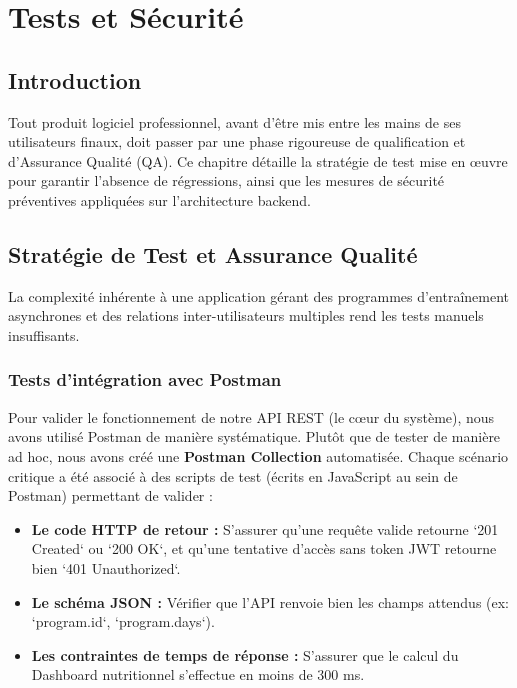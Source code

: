 \chapter{Tests et Sécurité} 
\minitoc
\newpage

\section{Introduction}
Tout produit logiciel professionnel, avant d'être mis entre les mains de ses utilisateurs finaux, doit passer par une phase rigoureuse de qualification et d'Assurance Qualité (QA). Ce chapitre détaille la stratégie de test mise en œuvre pour garantir l'absence de régressions, ainsi que les mesures de sécurité préventives appliquées sur l'architecture backend.

\section{Stratégie de Test et Assurance Qualité}
La complexité inhérente à une application gérant des programmes d'entraînement asynchrones et des relations inter-utilisateurs multiples rend les tests manuels insuffisants.

\subsection{Tests d'intégration avec Postman}
Pour valider le fonctionnement de notre API REST (le cœur du système), nous avons utilisé Postman de manière systématique.
Plutôt que de tester de manière ad hoc, nous avons créé une \textbf{Postman Collection} automatisée. Chaque scénario critique a été associé à des scripts de test (écrits en JavaScript au sein de Postman) permettant de valider :
\begin{itemize}
    \item \textbf{Le code HTTP de retour :} S'assurer qu'une requête valide retourne `201 Created` ou `200 OK`, et qu'une tentative d'accès sans token JWT retourne bien `401 Unauthorized`.
    \item \textbf{Le schéma JSON :} Vérifier que l'API renvoie bien les champs attendus (ex: `program.id`, `program.days`).
    \item \textbf{Les contraintes de temps de réponse :} S'assurer que le calcul du Dashboard nutritionnel s'effectue en moins de 300 ms.
\end{itemize}

